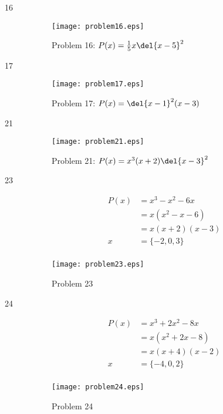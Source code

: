 \documentclass{exam}
\begin{document}
\begin{description}
    \item[16]
      \begin{figure}[H]
        \centering
        \texttt{[image: problem16.eps]}
        \caption*{Problem 16: $P(x) = \frac{1}{5} x \del{x - 5}^2$}
      \end{figure}

    \item[17]
      \begin{figure}[H]
        \centering
        \texttt{[image: problem17.eps]}
        \caption*{Problem 17: $P(x) = \del{x - 1}^2(x - 3)$}
      \end{figure}

    \item[21]
      \begin{figure}[H]
        \centering
        \texttt{[image: problem21.eps]}
        \caption*{Problem 21: $P(x) = x^3(x + 2)\del{x - 3}^2$}
      \end{figure}

    \item[23] 
      \begin{align*}
        P(x) &= x^3 - x^2 - 6x \\
             &= x(x^2 - x - 6) \\
             &= x(x + 2)(x - 3) \\
        x    &= \{ -2, 0, 3 \} \\
      \end{align*}
      
      \begin{figure}[H]
        \centering
        \texttt{[image: problem23.eps]}
        \caption*{Problem 23}
      \end{figure}

    \item[24] 
      \begin{align*}
        P(x) &= x^3 + 2x^2 - 8x \\
             &= x(x^2 + 2x - 8) \\
             &= x(x + 4)(x - 2) \\
        x    &= \{ -4, 0, 2 \} \\
      \end{align*}
      
      \begin{figure}[H]
        \centering
        \texttt{[image: problem24.eps]}
        \caption*{Problem 24}
      \end{figure}


\end{description}
\end{document}
